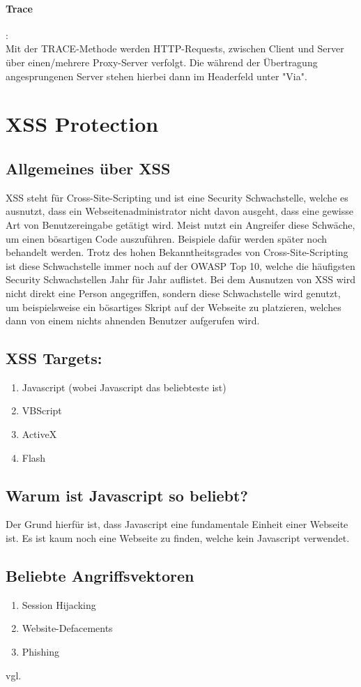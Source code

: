 \paragraph{Trace}:\\Mit der TRACE-Methode werden HTTP-Requests, zwischen Client und Server über einen/mehrere Proxy-Server verfolgt. Die während der Übertragung angesprungenen Server stehen hierbei dann im Headerfeld unter "Via".
\section{XSS Protection}
\label{sec:xss}
\subsection{Allgemeines über XSS}
\label{sec:xss_allgemein}
XSS steht für Cross-Site-Scripting und ist eine Security Schwachstelle, welche es ausnutzt, dass ein Webseitenadministrator nicht davon ausgeht, dass eine gewisse Art von Benutzereingabe getätigt wird. Meist nutzt ein Angreifer diese Schwäche, um einen bösartigen Code auszuführen. Beispiele dafür werden später noch behandelt werden. Trotz des hohen Bekanntheitsgrades von Cross-Site-Scripting ist diese Schwachstelle immer noch auf der OWASP Top 10, welche die häufigsten Security Schwachstellen Jahr für Jahr auflistet. Bei dem Ausnutzen von XSS wird nicht direkt eine Person angegriffen, sondern diese Schwachstelle wird genutzt, um beispielsweise ein bösartiges Skript auf der Webseite zu platzieren, welches dann von einem nichts ahnenden Benutzer aufgerufen wird.
\subsection{XSS Targets:}
\label{sec:xss_targets}
\begin{enumerate}
\item Javascript (wobei Javascript das beliebteste ist) 
\item VBScript 
\item ActiveX
\item Flash
\end{enumerate}
\subsection{Warum ist Javascript so beliebt?}
\label{sec:xss_why}
Der Grund hierfür ist, dass Javascript eine fundamentale Einheit einer Webseite ist. Es ist kaum noch eine Webseite zu finden, welche kein Javascript verwendet.
\subsection{Beliebte Angriffsvektoren}
\label{sec:xss_bel_agg}
\begin{enumerate}
\item Session Hijacking
\item Website-Defacements 
\item Phishing
\end{enumerate}
vgl. \textcite{XSS}
